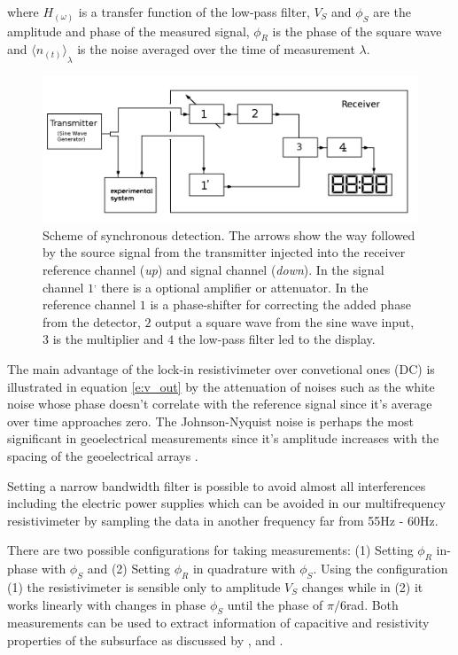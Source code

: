 \documentclass{vie16}
\begin{document}
where $H_{(\omega)}$ is a transfer function of the low-pass filter,
$V_{S}$ and $\phi_{S}$ are the amplitude and phase of the measured
signal, $\phi_{R}$ is the phase of the square wave and ${\langle
	n_{(t)} \rangle}_{\lambda}$ is the noise averaged over the time of
	measurement $\lambda$. 


\begin{figure}[H]
	\centering
	\includegraphics[keepaspectratio=true,scale=0.3]{Sistema-Inside_Lock_In}
	\caption{Scheme of synchronous detection. The arrows show the way followed by the source signal from the transmitter injected into the receiver reference channel (\textit{up}) and signal channel (\textit{down}). In the signal channel $1^{,}$ there is a optional amplifier or attenuator. In the reference channel $1$ is a phase-shifter for correcting the added phase from the detector, $2$ output a square wave from the sine wave input, $3$ is the multiplier and  $4$ the low-pass filter led to the display. }
	\label{f:Lock-in}
\end{figure}


The main advantage of the lock-in resistivimeter over convetional ones
(DC) is illustrated in equation \ref{e:v_out} by the attenuation of
noises such as the white noise whose phase doesn't correlate with the
reference signal since it's average over time approaches zero. The
Johnson-Nyquist noise is perhaps the most significant in geoelectrical
measurements since it's amplitude increases with the spacing of the
geoelectrical arrays \citep{alfano82}.

Setting a narrow bandwidth filter is possible to avoid almost all
interferences including the electric power supplies which can be
avoided in our multifrequency resistivimeter by sampling the data in
another frequency far from 55Hz - 60Hz.

There are two possible configurations for taking measurements: (1)
Setting $\phi_{R}$ in-phase with $\phi_{S}$ and (2) Setting $\phi_{R}$
in quadrature with $\phi_{S}$. Using the configuration (1) the
resistivimeter is sensible only to amplitude $V_{S}$ changes while in
(2) it works linearly with changes in phase $\phi_{S}$ until the phase
of ${\pi}/{6}$rad. Both measurements can be used to extract
information of capacitive and resistivity properties of the subsurface
as discussed by \citet{tarasov13},\citet{edmundo14} and
\citet{weller96}.
\end{document}
